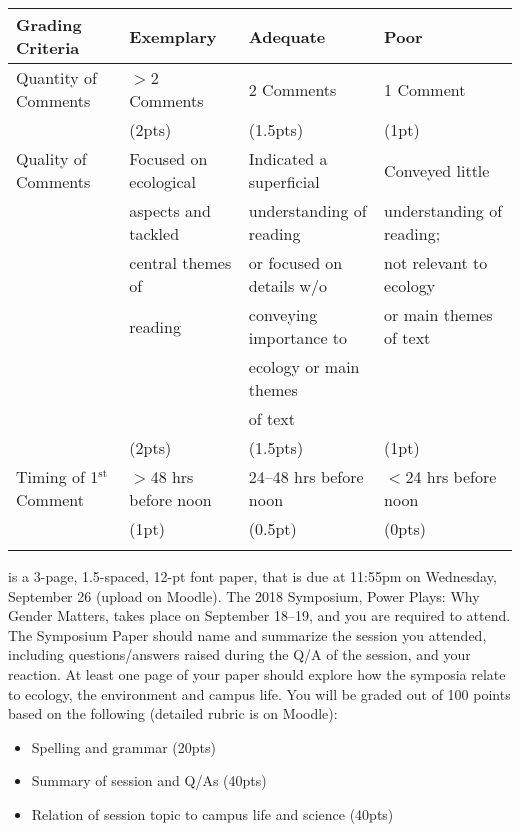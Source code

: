 \documentclass{tufte-handout}
\begin{document}
\begin{fullwidth}
\begin{tabular}{l l l l}
\\
\hline
\textbf{Grading Criteria} & \textbf{Exemplary} & \textbf{Adequate} & \textbf{Poor} \\
\hline
Quantity of Comments & $>$2 Comments & 2 Comments & 1 Comment \\
& (2pts) & (1.5pts) & (1pt) \\
\hline
Quality of Comments & Focused on ecological & Indicated a superficial & Conveyed little \\
& aspects and tackled & understanding of reading & understanding of reading; \\
& central themes of & or focused on details w/o& not relevant to ecology \\
& reading &  conveying importance to & or main themes of text \\
& & ecology or main themes & \\
& & of text & \\
& (2pts) & (1.5pts) & (1pt) \\
\hline
Timing of 1$^\mathrm{st}$ Comment & $>$48 hrs before noon & 24--48 hrs before noon & $<$24 hrs before noon \\
& (1pt) & (0.5pt) & (0pts) \\
\hline \\
\end{tabular}

 is a 3-page, 1.5-spaced, 12-pt font paper, that is due at 
11:55pm on Wednesday, September 26 (upload on Moodle). 											%
The 2018 Symposium, Power Plays: Why Gender Matters, %
takes place on September 18--19, 													 %
and you are required to attend. The Symposium Paper should name and summarize the session you attended, including questions/answers raised during the Q/A of the session, and your reaction. At least one page of your paper should explore how the symposia relate to ecology, the environment and campus life. You will be graded out of 100 points based on the following (detailed rubric is on Moodle): 

\begin{itemize}
\item Spelling and grammar (20pts)
\item Summary of session and Q/As (40pts)
\item Relation of session topic to campus life and science (40pts)
\end{itemize}


\newpage


\end{fullwidth}
\end{document}
